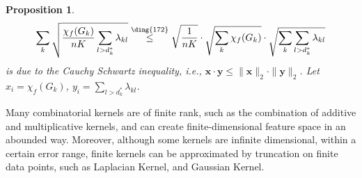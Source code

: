 \documentclass{article}
\def\vx{{\mathbf{x}}}
\def\vy{{\mathbf{y}}}
\def\leqone{\overset{\text{\ding{172}}}{\leq}}
\def\leqtwo{\overset{\text{\ding{173}}}{\leq}}
\newtheorem{proposition}{Proposition}
\begin{document}
\begin{proposition} \label{pro: kernel proof1}
\begin{align*}
    \sum_k \sqrt{\frac{\chi_f(G_k)}{n K} \sum_{l > d_k^*} \lambda_{kl}} \leqone \sqrt{\frac{1}{n K}} \cdot \sqrt{\sum_k \chi_f(G_k)} \cdot \sqrt{\sum_k \sum_{l > d^*_k} \lambda_{kl}}
\end{align*}
 is due to the Cauchy Schwartz inequality, i.e., $\vx \cdot \vy \leq \|\vx\|_2 \cdot \|\vy\|_2$. Let $x_i = \chi_f(G_k)$, $y_i = \sum_{l >d_k^*} \lambda_{kl}$. 
\end{proposition}

Many combinatorial kernels are of finite rank, such as the combination of additive and multiplicative kernels, and can create finite-dimensional feature space in an abounded way. Moreover, although some kernels are infinite dimensional, within a certain error range, finite kernels can be approximated by truncation on finite data points, such as Laplacian Kernel, and Gaussian Kernel. 
\end{document}
